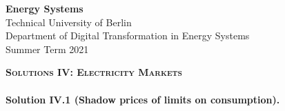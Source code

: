 \documentclass[11pt,a4paper,fleqn]{scrartcl}
\begin{document}
\begin{flushright}
  \textbf{Energy Systems}\\
  {\small Technical University of Berlin}\\
  {\small Department of Digital Transformation in Energy Systems}\\
  {\small Summer Term 2021}\\
 \end{flushright}
 
  
  \vspace{-0.5em}
  \hrulefill
  \vspace{0.3em}
 
 \begin{center}
  \textbf{\textsc{\Large Solutions IV: Electricity Markets}}\\[2.5em]
 \end{center}
 

 \vspace{-0.5em}
 \hrulefill
 \vspace{0.8em}
 

\paragraph{Solution IV.1 \normalsize (Shadow prices of limits on consumption).}~\\
\end{document}
